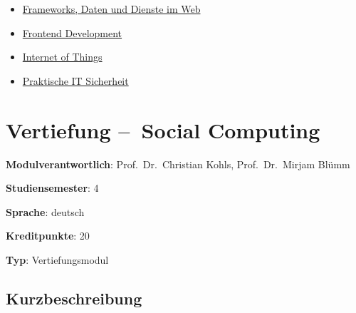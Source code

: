 \begin{itemize}
\tightlist
\item
  \hyperref[/mi-2017/modulbeschreibungen-bachelor/BA_WD_Frameworks-daten-und-dienste]{Frameworks, Daten und Dienste im Web}
\item
  \hyperref[/mi-2017/modulbeschreibungen-bachelor/BA_WD_Frontend-Development]{Frontend Development}
\item
  \hyperref[/mi-2017/modulbeschreibungen-bachelor/BA_WD_Internet-of-things]{Internet of Things}
\item
  \hyperref[/mi-2017/modulbeschreibungen-bachelor/BA_WD_Praktische-IT-Sicherheit]{Praktische IT Sicherheit}
\end{itemize}

\hypertarget{vertiefung-social-computingpathlabelmi-2017modulbeschreibungen-bachelorba_vertiefung_socialcomputing}{%
\chapter{Vertiefung --~Social
Computing\label{/mi-2017/modulbeschreibungen-bachelor/BA_Vertiefung_SocialComputing}}\label{vertiefung-social-computingpathlabelmi-2017modulbeschreibungen-bachelorba_vertiefung_socialcomputing}}

\begin{modulHead}
\textbf{Modulverantwortlich}: Prof.~Dr.~Christian
Kohls, Prof.~Dr.~Mirjam
Blümm
\end{modulHead}
\begin{modulHead}
\textbf{Studiensemester}:
4
\end{modulHead}
\begin{modulHead}
\textbf{Sprache}:
deutsch
\end{modulHead}
\begin{modulHead}
\textbf{Kreditpunkte}:
20
\end{modulHead}
\begin{modulHead}
\textbf{Typ}:
Vertiefungsmodul
\end{modulHead}


\hypertarget{kurzbeschreibungpathlabelmi-2017modulbeschreibungen-bachelorba_vertiefung_socialcomputing}{%
\section*{Kurzbeschreibung\label{/mi-2017/modulbeschreibungen-bachelor/BA_Vertiefung_SocialComputing}}\label{kurzbeschreibungpathlabelmi-2017modulbeschreibungen-bachelorba_vertiefung_socialcomputing}}

